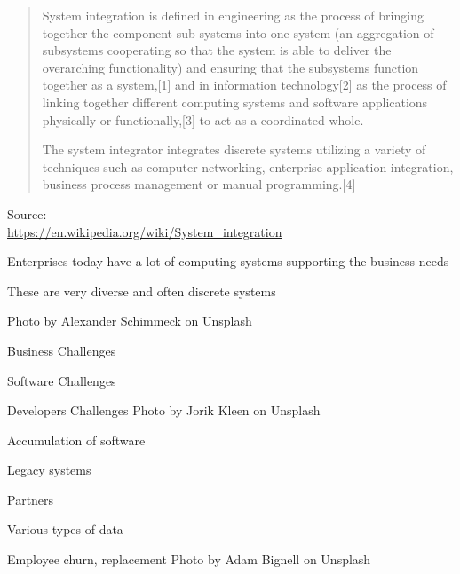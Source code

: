 \documentclass[Screen16to9,17pt]{foils}
\begin{document}


\begin{quote}
  System integration is defined in engineering as the process of bringing together the component sub-systems into one system (an aggregation of subsystems cooperating so that the system is able to deliver the overarching functionality) and ensuring that the subsystems function together as a system,[1] and in information technology[2] as the process of linking together different computing systems and software applications physically or functionally,[3] to act as a coordinated whole.

  The system integrator integrates discrete systems utilizing a variety of techniques such as computer networking, enterprise application integration, business process management or manual programming.[4]
\end{quote}

Source:\\
\url{https://en.wikipedia.org/wiki/System_integration}





\begin{list2}
\item Enterprises today have a lot of computing systems supporting the business needs
\item These are very diverse and often discrete systems
\end{list2}

\hfill Photo by Alexander Schimmeck on Unsplash



\begin{list2}
\item Business Challenges
\item Software Challenges
\item Developers Challenges \hfill Photo by Jorik Kleen on Unsplash
\end{list2}






\begin{list2}
\item Accumulation of software
\item Legacy systems
\item Partners
\item Various types of data
\item Employee churn, replacement \hfill Photo by Adam Bignell on Unsplash
\end{list2}
\end{document}
